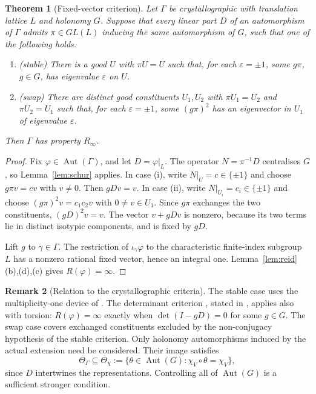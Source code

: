\documentclass[11pt]{article}
\newtheorem{theorem}{Theorem}[section]
\theoremstyle{definition}
\newtheorem{remark}[theorem]{Remark}
\newcommand{\Aut}{\operatorname{Aut}}
\newcommand{\Rinf}{R_\infty}
\begin{document}
\begin{theorem}[Fixed-vector criterion]\label{thm:crit}
Let $\Gamma$ be crystallographic with translation lattice $L$ and holonomy $G$.
Suppose that every linear part $D$ of an automorphism of $\Gamma$ admits $\pi\in GL(L)$
inducing the same automorphism of $G$, such that one of the following holds.
\begin{enumerate}[label=(\roman*)]
\item\emph{(stable)} There is a good $U$ with $\pi U=U$ such that, for each $\varepsilon=\pm1$,
some $g\pi$, $g\in G$, has eigenvalue $\varepsilon$ on $U$.
\item\emph{(swap)} There are distinct good constituents $U_1,U_2$ with $\pi U_1=U_2$ and $\pi U_2=U_1$
such that, for each $\varepsilon=\pm1$, some $(g\pi)^2$ has an eigenvector in $U_1$ of eigenvalue $\varepsilon$.
\end{enumerate}
Then $\Gamma$ has property $\Rinf$.
\end{theorem}
\begin{proof}
Fix $\varphi\in\Aut(\Gamma)$, and let $D=\varphi|_L$.
The operator $N=\pi^{-1}D$ centralises $G$, so Lemma~\ref{lem:schur} applies.
In case (i), write $N|_U=c\in\{\pm1\}$ and choose $g\pi v=cv$ with $v\ne0$.
Then $gDv=v$.
In case (ii), write $N|_{U_i}=c_i\in\{\pm1\}$ and choose $(g\pi)^2v=c_1c_2v$ with
$0\ne v\in U_1$. Since $g\pi$ exchanges the two constituents, $(gD)^2v=v$.
The vector $v+gDv$ is nonzero, because its two terms lie in distinct isotypic components, and is fixed by $gD$.

Lift $g$ to $\gamma\in\Gamma$. The restriction of $\iota_\gamma\varphi$ to the characteristic
finite-index subgroup $L$ has a nonzero rational fixed vector, hence an integral one.
Lemma~\ref{lem:reid}(b),(d),(c) gives $R(\varphi)=\infty$.
\end{proof}

\begin{remark}[Relation to the crystallographic criteria]\label{rem:crystal}
The stable case uses the multiplicity-one device of \cite[Thm.~4.7]{DDP09}.
The determinant criterion \cite[Cor.~3.10]{DP11}, stated in \cite[Thm.~3.3]{DKT19}, applies also
with torsion: $R(\varphi)=\infty$ exactly when $\det(I-gD)=0$ for some $g\in G$.
The swap case covers exchanged constituents excluded by the non-conjugacy hypothesis of the stable criterion.
Only holonomy automorphisms induced by the actual extension need be considered. Their image satisfies
\[
 \Theta_\Gamma\subseteq\Theta_\chi
 :=\{\theta\in\Aut(G):\chi_V\circ\theta=\chi_V\},
\]
since $D$ intertwines the representations. Controlling all of $\Aut(G)$ is a sufficient stronger condition.
\end{remark}
\end{document}
